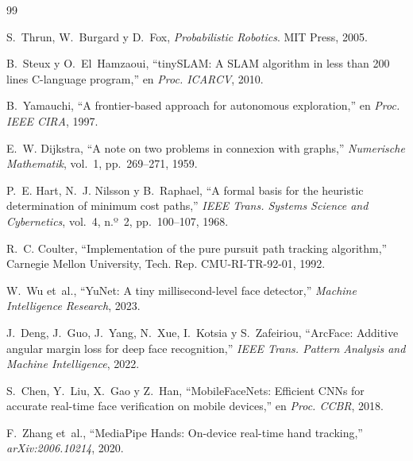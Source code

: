 \documentclass[11pt,a4paper]{article}
\begin{document}
\clearpage
\begin{thebibliography}{99}

 S.~Thrun, W.~Burgard y D.~Fox, \textit{Probabilistic Robotics}. MIT Press, 2005.

 B.~Steux y O.~El~Hamzaoui, ``tinySLAM: A SLAM algorithm in less than 200 lines C-language program,'' en \textit{Proc. ICARCV}, 2010.

 B.~Yamauchi, ``A frontier-based approach for autonomous exploration,'' en \textit{Proc. IEEE CIRA}, 1997.

 E.~W. Dijkstra, ``A note on two problems in connexion with graphs,'' \textit{Numerische Mathematik}, vol.~1, pp.~269--271, 1959.

 P.~E. Hart, N.~J. Nilsson y B.~Raphael, ``A formal basis for the heuristic determination of minimum cost paths,'' \textit{IEEE Trans. Systems Science and Cybernetics}, vol.~4, n.º~2, pp.~100--107, 1968.

 R.~C. Coulter, ``Implementation of the pure pursuit path tracking algorithm,'' Carnegie Mellon University, Tech. Rep. CMU-RI-TR-92-01, 1992.

 W.~Wu et~al., ``YuNet: A tiny millisecond-level face detector,'' \textit{Machine Intelligence Research}, 2023.

 J.~Deng, J.~Guo, J.~Yang, N.~Xue, I.~Kotsia y S.~Zafeiriou, ``ArcFace: Additive angular margin loss for deep face recognition,'' \textit{IEEE Trans. Pattern Analysis and Machine Intelligence}, 2022.

 S.~Chen, Y.~Liu, X.~Gao y Z.~Han, ``MobileFaceNets: Efficient CNNs for accurate real-time face verification on mobile devices,'' en \textit{Proc. CCBR}, 2018.

 F.~Zhang et~al., ``MediaPipe Hands: On-device real-time hand tracking,'' \textit{arXiv:2006.10214}, 2020.

\end{thebibliography}
\end{document}
